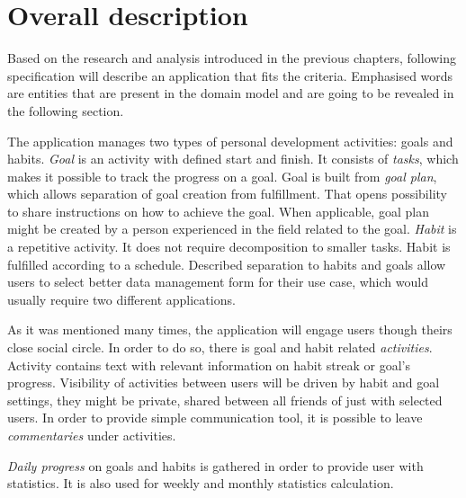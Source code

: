 
\section{Overall description}\label{sec:overall-description}

Based on the research and analysis introduced in the previous chapters, following specification will describe an application that fits the criteria.
Emphasised words are entities that are present in the domain model and are going to be revealed in the following section.

The application manages two types of personal development activities: goals and habits.
\textit{Goal} is an activity with defined start and finish.
It consists of \textit{tasks}, which makes it possible to track the progress on a goal.
Goal is built from \textit{goal plan}, which allows separation of goal creation from fulfillment.
That opens possibility to share instructions on how to achieve the goal.
When applicable, goal plan might be created by a person experienced in the field related to the goal.
\textit{Habit} is a repetitive activity.
It does not require decomposition to smaller tasks.
Habit is fulfilled according to a schedule.
Described separation to habits and goals allow users to select better data management form for their use case, which would usually require two different applications.

As it was mentioned many times, the application will engage users though theirs close social circle.
In order to do so, there is goal and habit related \textit{activities}.
Activity contains text with relevant information on habit streak or goal's progress.
Visibility of activities between users will be driven by habit and goal settings, they might be private, shared between all friends of just with selected users.
In order to provide simple communication tool, it is possible to leave \textit{commentaries} under activities.

\textit{Daily progress} on goals and habits is gathered in order to provide user with statistics.
It is also used for weekly and monthly statistics calculation.